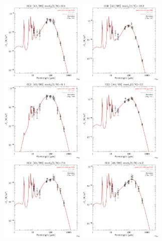 \documentclass[preprint2,longabstract]{aastex}
\begin{document}
\begin{figure}
\centering
    \includegraphics[trim=0 2mm 0 0, clip, width=40mm]{SEDs/sed_41.pdf}
	\includegraphics[trim=0 2mm 0 0, clip, width=40mm]{SEDs/sed_42.pdf}
	\includegraphics[trim=0 2mm 0 0, clip, width=40mm]{SEDs/sed_43.pdf}
	\includegraphics[trim=0 2mm 0 0, clip, width=40mm]{SEDs/sed_44.pdf}
	\includegraphics[trim=0 2mm 0 0, clip, width=40mm]{SEDs/sed_45.pdf}
	\includegraphics[trim=0 2mm 0 0, clip, width=40mm]{SEDs/sed_46.pdf}

\end{figure}
\end{document}
